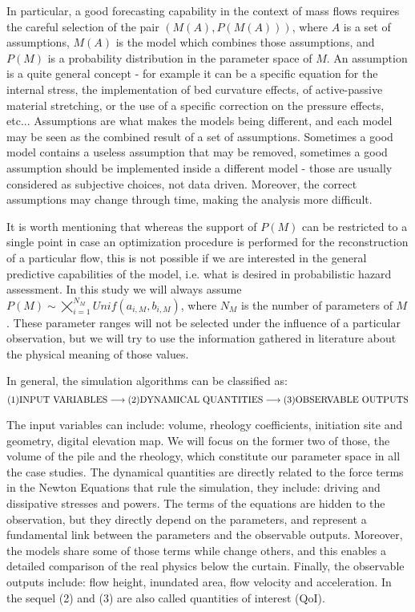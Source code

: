 \documentclass{article}
\begin{document}
In particular, a good forecasting capability in the context of mass flows requires the careful selection of the pair $(M(A), P(M(A)))$, where $A$ is a set of assumptions, $M(A)$ is the model which combines those assumptions, and $P(M)$ is a probability distribution in the parameter space of $M$. An assumption is a quite general concept - for example it can be a specific equation for the internal stress, the implementation of bed curvature effects, of active-passive material stretching, or the use of a specific correction on the pressure effects, etc... Assumptions are what makes the models being different, and each model may be seen as the combined result of a set of assumptions. Sometimes a good model contains a useless assumption that may be removed, sometimes a good assumption should be implemented inside a different model - those are usually considered as subjective choices, not data driven. Moreover, the correct assumptions may change through time, making the analysis more difficult.

It is worth mentioning that whereas the support of $P(M)$ can be restricted to a single point in case an optimization procedure is performed for the reconstruction of a particular flow, this is not possible if we are interested in the general predictive capabilities of the model, i.e. what is desired in probabilistic hazard assessment. In this study we will always assume $P(M)\sim \varprod_{i=1}^{N_M} Unif(a_{i,M},b_{i,M})$, where $N_M$ is the number of parameters of $M$. These parameter ranges will not be selected under the influence of a particular observation, but we will try to use the information gathered in literature about the physical meaning of those values.

In general, the simulation algorithms can be classified as:
$$\textmd{(1)INPUT VARIABLES} \longrightarrow \textmd{(2)DYNAMICAL QUANTITIES} \longrightarrow \textmd{(3)OBSERVABLE OUTPUTS}$$

The input variables can include: volume, rheology coefficients, initiation site and geometry, digital elevation map. We will focus on the former two of those, the volume of the pile and the rheology, which constitute our parameter space in all the case studies. The dynamical quantities are directly related to the force terms in the Newton Equations that rule the simulation, they include: driving and dissipative stresses and powers. The terms of the equations are hidden to the observation, but they directly depend on the parameters, and represent a fundamental link between the parameters and the observable outputs. Moreover, the models share some of those terms while change others, and this enables a detailed comparison of the real physics below the curtain. Finally, the observable outputs include: flow height, inundated area, flow velocity and acceleration. In the sequel (2) and (3) are also called quantities of interest (QoI).
\end{document}
